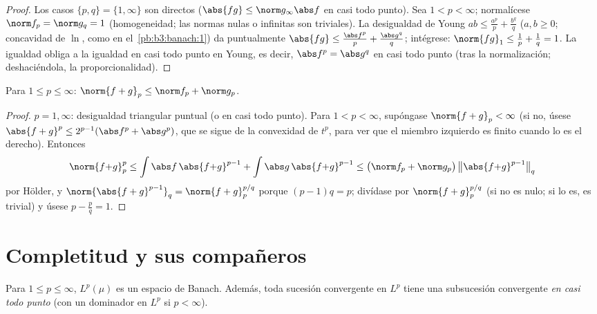 \begin{proof}
Los casos $\{p, q\} = \{1, \infty\}$ son directos ($\abs{fg} \leq
\norm g_\infty\abs f$ en casi todo punto). Sea $1 < p < \infty$;
normalícese $\norm f_p = \norm g_q = 1$ (homogeneidad; las normas nulas
o infinitas son triviales). La desigualdad de Young
$ab \leq \frac{a^p}p +
\frac{b^q}q$ ($a, b \geq 0$; concavidad de $\ln$, como en
el~\cref{pb:b3:banach:1}) da puntualmente $\abs{f g} \leq
\frac{\abs f^p}p + \frac{\abs g^q}q$; intégrese: $\norm{fg}_1
\leq \frac1p + \frac1q = 1$. La igualdad obliga a la igualdad en casi
todo punto en Young, es decir, $\abs f^p = \abs g^q$ en casi todo punto
(tras la normalización; deshaciéndola, la proporcionalidad).
\end{proof}

\begin{theorem}\label{thm:b3:lp:minkowski}
Para $1 \leq p \leq \infty$: $\norm{f + g}_p \leq \norm f_p +
\norm g_p$.
\end{theorem}

\begin{proof}
$p = 1, \infty$: desigualdad triangular puntual (o en casi todo punto).
Para $1 <
p < \infty$, supóngase $\norm{f+g}_p < \infty$ (si no, úsese
$\abs{f+g}^p \leq 2^{p-1}(\abs f^p + \abs g^p)$, que se sigue de la
convexidad de $t^p$, para ver que el miembro izquierdo es finito cuando
lo es el derecho). Entonces
\[
\norm{f{+}g}_p^p \leq \int\abs f\,\abs{f{+}g}^{p-1} +
\int\abs g\,\abs{f{+}g}^{p-1}
\leq \bigl(\norm f_p + \norm g_p\bigr)\,
\bigl\|\abs{f{+}g}^{p-1}\bigr\|_q
\]
por Hölder, y $\norm{\abs{f+g}^{p-1}}_q =
\norm{f+g}_p^{p/q}$ porque $(p-1)q = p$; divídase por
$\norm{f+g}_p^{p/q}$ (si no es nulo; si lo es, es trivial) y úsese $p -
\frac pq = 1$.
\end{proof}

\section{Completitud y sus compañeros}

\begin{theorem}\label{thm:b3:lp:complete}
Para $1 \leq p \leq \infty$, $L^p(\mu)$ es un espacio de Banach. Además,
toda sucesión convergente en $L^p$ tiene una subsucesión convergente
\emph{en casi todo punto} (con un dominador
en $L^p$ si $p < \infty$).
\end{theorem}

